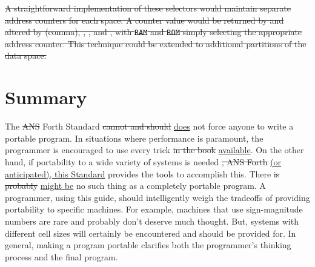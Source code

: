 \sout{%
A straightforward implementation of these selectors would maintain
separate address counters for each space. A counter value would be
returned by  and altered by \word{,} (comma), ,
, and , with \texttt{RAM} and \texttt{ROM}
simply selecting the appropriate address counter. This technique
could be extended to additional partitions of the data space.}


\section{Summary} %

The \sout{ANS} Forth Standard \sout{cannot and should} \uline{does} not force anyone to write
a portable program. In situations where performance is paramount,
the programmer is encouraged to use every trick \sout{in the book} \uline{available}. On the
other hand, if portability to a wide variety of systems is needed%
\sout{, ANS Forth} \uline{(or anticipated), this Standard} provides the tools to accomplish this. There
\sout{is probably} \uline{might be} no such thing as a completely portable program. A programmer, using
this guide, should intelligently weigh the tradeoffs of providing
portability to specific machines. For example, machines that use
sign-magnitude numbers are rare and probably don't deserve much
thought. But, systems with different cell sizes will certainly be
encountered and should be provided for. In general, making a program
portable clarifies both the programmer's thinking process and the
final program.
\cbend